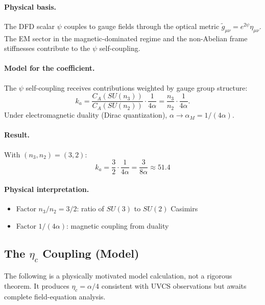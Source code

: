 \paragraph{Physical basis.}
The DFD scalar $\psi$ couples to gauge fields through the optical metric $\tilde{g}_{\mu\nu} = e^{2\psi}\eta_{\mu\nu}$. The EM sector in the magnetic-dominated regime and the non-Abelian frame stiffnesses contribute to the $\psi$ self-coupling.

\paragraph{Model for the coefficient.}
The $\psi$ self-coupling receives contributions weighted by gauge group structure:
\begin{equation}
k_a = \frac{C_A(SU(n_3))}{C_A(SU(n_2))} \cdot \frac{1}{4\alpha} = \frac{n_3}{n_2} \cdot \frac{1}{4\alpha}.
\end{equation}
Under electromagnetic duality (Dirac quantization), $\alpha \to \alpha_M = 1/(4\alpha)$.

\paragraph{Result.}
With $(n_3, n_2) = (3, 2)$:
\begin{equation}
\boxed{k_a = \frac{3}{2} \cdot \frac{1}{4\alpha} = \frac{3}{8\alpha} \approx 51.4}
\end{equation}

\paragraph{Physical interpretation.}
\begin{itemize}
\item Factor $n_3/n_2 = 3/2$: ratio of $SU(3)$ to $SU(2)$ Casimirs
\item Factor $1/(4\alpha)$: magnetic coupling from duality
\end{itemize}

\subsection{The $\eta_c$ Coupling (Model)}\label{app:eta-model}

\begin{tcolorbox}[colback=yellow!5!white, colframe=yellow!60!black, title=Methodological Note]
The following is a physically motivated model calculation, not a rigorous theorem. It produces $\eta_c = \alpha/4$ consistent with UVCS observations but awaits complete field-equation analysis.
\end{tcolorbox}


